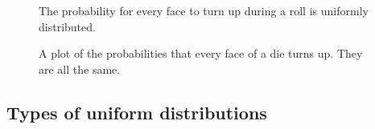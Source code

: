 \documentclass[
  a4paper,
]{scrbook}
\begin{document}
\begin{figure}[ht]


\caption{\label{fig-unif-die}The probability for every face to turn up
during a roll is uniformly distributed.}

\end{figure}%

\begin{figure}[ht]


\caption{\label{fig-unif-pmf}A plot of the probabilities that every face
of a die turns up. They are all the same.}

\end{figure}%

\subsection{Types of uniform
distributions}\label{types-of-uniform-distributions}
\end{document}
